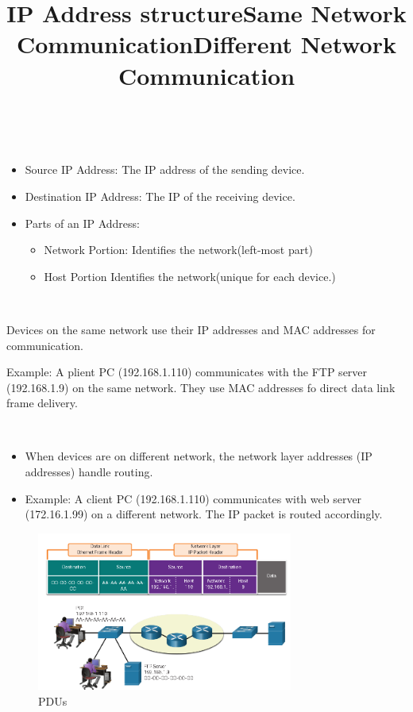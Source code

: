 \documentclass[a4paper,11pt]{article}
\begin{document}
\title{IP Address structure}\\
\begin{itemize}
    \item Source IP Address: The IP address of the sending device.
    \item Destination IP Address: The IP of the receiving device.
    \item Parts of an IP Address:\\
        \begin{itemize}
            \item Network Portion: Identifies the network(left-most part)\\
            \item Host Portion Identifies the network(unique for each device.)\\
        \end{itemize}
\end{itemize}

\title{Same Network Communication}\\
\item Devices on the same network use their IP addresses and MAC addresses for communication.\\
\item Example: A plient PC (192.168.1.110) communicates with the FTP server (192.168.1.9) on the same network. They use MAC addresses fo direct data link frame delivery.\\

\title{Different Network Communication}\\
\begin{itemize}
    \item When devices are on different network, the network layer addresses (IP addresses) handle routing.\\
    \item Example: A client PC (192.168.1.110) communicates with web server (172.16.1.99) on a different network. The IP packet is routed accordingly.\\
\end{itemize}

\begin{figure}[h!]
    \centering
    \includegraphics[width=0.75\textwidth]{9.png}
    \caption{PDUs}
    \label{fig:cap1}
\end{figure}
\end{document}
